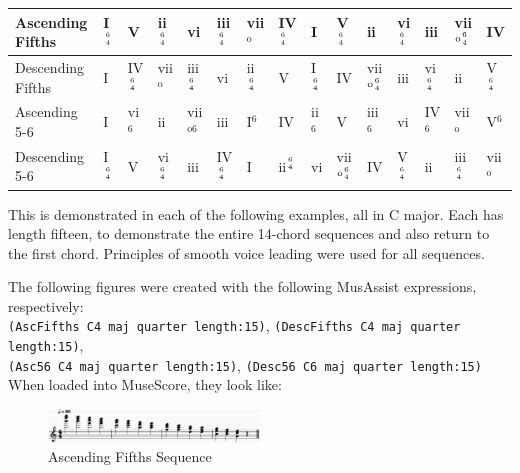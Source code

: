 \documentclass{report}
\begin{document}
\begin{table}[h!]
\begin{tabular}{|l|llllllllllllll|}
\hline
Ascending Fifths  & I$^{6 \atop 4}$ & V                & ii$^{6 \atop 4}$ & vi                & iii$^{6 \atop 4}$ & vii$^\text{o}$   & IV$^{6 \atop 4}$ & I               & V$^{6 \atop 4}$             & ii                          & vi$^{6 \atop 4}$ & iii              & vii$^{\text{o}{6 \atop 4}}$ & IV              \\ \hline
Descending Fifths & I               & IV$^{6 \atop 4}$ & vii$^\text{o}$   & iii$^{6 \atop 4}$ & vi                & ii$^{6 \atop 4}$ & V                & I$^{6 \atop 4}$ & IV                          & vii$^{\text{o}{6 \atop 4}}$ & iii              & vi$^{6 \atop 4}$ & ii                          & V$^{6 \atop 4}$ \\ \hline
Ascending 5-6     & I               & vi$^6$           & ii               & vii$^{\text{o}6}$ & iii               & I$^6$            & IV               & ii$^6$          & V                           & iii$^6$                     & vi               & IV$^6$           & vii$^\text{o}$              & V$^6$           \\ \hline
Descending 5-6    & I$^{6 \atop 4}$ & V                & vi$^{6 \atop 4}$ & iii & IV$^{6 \atop 4}$  & I                & ii$^{6 \atop 4}$ & vi              & vii$^{\text{o}{6 \atop 4}}$ & IV                          & V$^{6 \atop 4}$  & ii               & iii$^{6 \atop 4}$           & vii$^\text{o}$  \\ \hline
\end{tabular}
\end{table}

This is demonstrated in each of the following examples, all in C major. Each has length fifteen, to demonstrate the entire 14-chord sequences and also return to the first chord. Principles of smooth voice leading were used for all sequences.

The following figures were created with the following MusAssist expressions, respectively: \\\verb.(AscFifths C4 maj quarter length:15)., \verb.(DescFifths C4 maj quarter length:15)., \\\verb.(Asc56 C4 maj quarter length:15)., \verb.(Desc56 C6 maj quarter length:15). When loaded into MuseScore, they look like:

\begin{figure}[h!]
\centering
\includegraphics[width=0.5\textwidth]{images/ascfifths}
  \caption{Ascending Fifths Sequence}
  \label{fig:ascfifths}
\end{figure}
\end{document}
